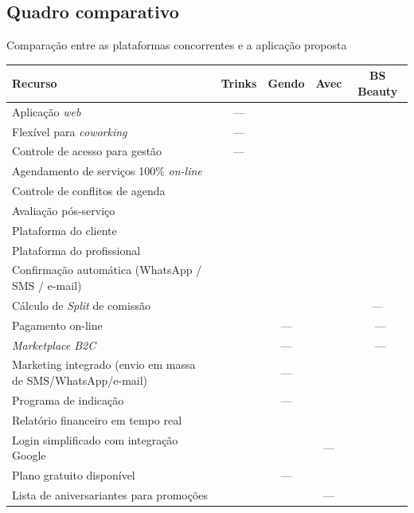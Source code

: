 \subsection{Quadro comparativo}

\begin{quadro}[htb]
	\caption{\label{frame:comparativo_concorrência}Comparação entre as plataformas concorrentes e a aplicação proposta}
	\footnotesize
	\setlength{\tabcolsep}{4pt}
	\begin{tabular}{|p{6.8cm}|c|c|c|c|}
		\hline
		\textbf{Recurso}                                   & \textbf{Trinks} & \textbf{Gendo} & \textbf{Avec} & \textbf{BS Beauty}\\ \hline 
		Aplicação \textit{web}  & — & \checkmark & \checkmark & \checkmark \\ \hline
		Flexível para \emph{coworking}  & — & \checkmark & \checkmark & \checkmark \\ \hline
		Controle de acesso para gestão  & — & \checkmark  & \checkmark & \checkmark \\ \hline
		Agendamento de serviços 100\% \emph{on-line} & \checkmark & \checkmark & \checkmark & \checkmark \\ \hline
		Controle de conflitos de agenda                    & \checkmark & \checkmark & \checkmark & \checkmark \\ \hline
		Avaliação pós-serviço  & \checkmark & \checkmark  & \checkmark  & \checkmark \\ \hline
		Plataforma do cliente                               & \checkmark & \checkmark & \checkmark & \checkmark \\ \hline
		Plataforma do profissional                                      & \checkmark & \checkmark & \checkmark & \checkmark \\ \hline
		Confirmação automática (WhatsApp / SMS / e-mail)                    & \checkmark & \checkmark & \checkmark & \checkmark \\ \hline
		Cálculo de \emph{Split} de comissão      & \checkmark & \checkmark & \checkmark & — \\ \hline
		Pagamento on-line                 & \checkmark & — & \checkmark & \ — \\ \hline
		\emph{Marketplace B2C}                         & \checkmark & — & \checkmark & \ — \\ \hline
		Marketing integrado (envio em massa de SMS/WhatsApp/e-mail)  & \checkmark & — & \checkmark & \checkmark \\ \hline
		Programa de indicação  & \checkmark & — & \checkmark & \checkmark \\ \hline
		Relatório financeiro em tempo real    & \checkmark & \checkmark & \checkmark & \checkmark \\ \hline
		Login simplificado com integração Google            & \checkmark & \checkmark &  — & \checkmark \\ \hline
		Plano gratuito disponível                                           & \checkmark & — & \checkmark & \checkmark \\ \hline
		Lista de aniversariantes para promoções  & \checkmark & \checkmark & — & \checkmark \\ \hline
		

\end{tabular}
\end{quadro}
